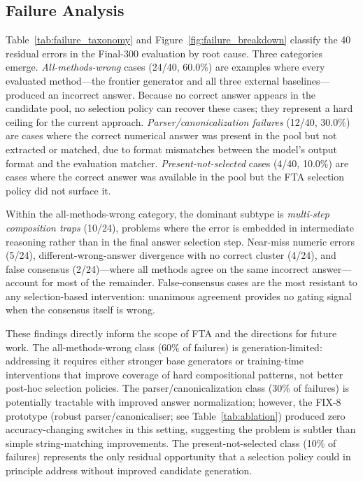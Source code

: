 \subsection{Failure Analysis}
\label{sec:failure_analysis}

Table~\ref{tab:failure_taxonomy} and Figure~\ref{fig:failure_breakdown}
classify the 40 residual errors in the Final-300 evaluation by root cause.
Three categories emerge.
\emph{All-methods-wrong} cases (24/40, 60.0\%) are examples where every
evaluated method---the frontier generator and all three external
baselines---produced an incorrect answer.
Because no correct answer appears in the candidate pool, no selection policy
can recover these cases; they represent a hard ceiling for the current
approach.
\emph{Parser/canonicalization failures} (12/40, 30.0\%) are cases where the
correct numerical answer was present in the pool but not extracted or matched,
due to format mismatches between the model's output format and the evaluation
matcher.
\emph{Present-not-selected} cases (4/40, 10.0\%) are cases where the correct
answer was available in the pool but the FTA selection policy did not surface
it.

Within the all-methods-wrong category, the dominant subtype is
\emph{multi-step composition traps} (10/24), problems where the error is
embedded in intermediate reasoning rather than in the final answer selection
step.
Near-miss numeric errors (5/24), different-wrong-answer divergence with no
correct cluster (4/24), and false consensus (2/24)---where all methods agree
on the same incorrect answer---account for most of the remainder.
False-consensus cases are the most resistant to any selection-based
intervention: unanimous agreement provides no gating signal when the
consensus itself is wrong.

These findings directly inform the scope of FTA and the directions for future
work.
The all-methods-wrong class (60\% of failures) is generation-limited:
addressing it requires either stronger base generators or training-time
interventions that improve coverage of hard compositional patterns, not better
post-hoc selection policies.
The parser/canonicalization class (30\% of failures) is potentially tractable
with improved answer normalization; however, the FIX-8 prototype (robust
parser/canonicaliser; see Table~\ref{tab:ablation}) produced zero
accuracy-changing switches in this setting, suggesting the problem is subtler
than simple string-matching improvements.
The present-not-selected class (10\% of failures) represents the only residual
opportunity that a selection policy could in principle address without improved
candidate generation.
